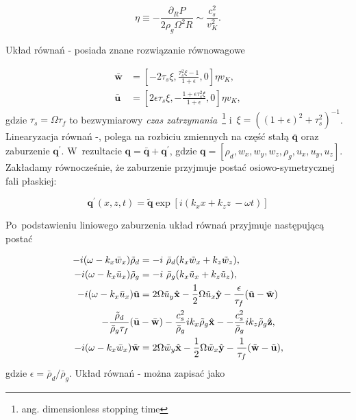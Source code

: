 \begin{equation}
\eta \equiv - \frac{\partial_R P}{2\rho_g\Omega^2 R} \sim \frac{c_s^2}{v_K^2}.
\end{equation}

Układ równań - posiada znane rozwiązanie równowagowe~\citep{N86}

\begin{align}
\bar{\mathbf{w}} &= \left[ 
 -2\tau_s\xi, \frac{\tau_s^2\xi - 1}{1+\epsilon},
 0
\right]\eta v_K, \label{eq:w0}\\
\bar{\mathbf{u}} &= \left[ 
 2\epsilon\tau_s\xi, -\frac{1 + \epsilon\tau_s^2\xi}{1+\epsilon},
 0
\right]\eta v_K, \label{eq:u0}
\end{align}
%
gdzie $\tau_s = \Omega \tau_f$ to bezwymiarowy \emph{czas
zatrzymania}~\footnote{ang. dimensionless stopping time} i~$\xi =
((1+\epsilon)^2 + \tau_s^2)^{-1}$.  Linearyzacja równań -,
polega na rozbiciu zmiennych na część stałą $\bar{\mathbf{q}}$ oraz zaburzenie
$\mathbf{q}^\prime$. W~rezultacie $\mathbf{q} =
\bar{\mathbf{q}} + \mathbf{q}^\prime$, gdzie $\mathbf{q}=[\rho_d, w_x, w_y, w_z,
\rho_g, u_x, u_y, u_z]$. Zakładamy równocześnie, że zaburzenie przyjmuje postać
osiowo-symetrycznej fali płaskiej:

\begin{equation}
   \label{eq:planar}
   \mathbf{q}^\prime(x,z,t) = \tilde{\mathbf{q}}
 \exp\left[i(k_x x + k_z z~-\omega t)\right]
\end{equation}

Po~podstawieniu liniowego zaburzenia układ równań przyjmuje następującą postać

\begin{align}
-i(\omega- k_x\bar{w}_x)\tilde{\rho}_d &= 
 - i~\bar{\rho}_d(k_x\tilde{w}_x + k_z\tilde{w}_z), \label{lin1}\\
-i(\omega- k_x\bar{u}_x)\tilde{\rho}_g &= 
 - i~\bar{\rho}_g(k_x\tilde{u}_x + k_z\tilde{u}_z), \label{lin2}\\
-i(\omega- k_x\bar{u}_x)\tilde{\mathbf{u}} &= 
 2\Omega \tilde{u}_y\hat{\mathbf{x}} - \frac{1}{2}\Omega \tilde{u}_x
 \hat{\mathbf{y}}
 -\frac{\epsilon}{\tau_f}(\tilde{\mathbf{u}} - \tilde{\mathbf{w}}) \notag\\
  -\frac{\tilde{\rho}_d}{\bar{\rho}_g\tau_f}
  (\bar{\mathbf{u}} &- \bar{\mathbf{w}})
  - \frac{c_s^2}{\bar{\rho}_g}ik_x\tilde{\rho}_g\hat{\mathbf{x}} -
  - \frac{c_s^2}{\bar{\rho}_g}ik_z\tilde{\rho}_g\hat{\mathbf{z}}, \label{lin3}\\
-i(\omega- k_x\bar{w}_x)\tilde{\mathbf{w}} &= 
 2\Omega \tilde{w}_y\hat{\mathbf{x}} - \frac{1}{2}\Omega \tilde{w}_x
 \hat{\mathbf{y}} 
 - \frac{1}{\tau_f} (\tilde{\mathbf{w}} - \tilde{\mathbf{u}}), \label{lin4}
\end{align}
%
gdzie $\epsilon = \bar{\rho}_d/\bar{\rho}_g$. Układ równań
- można zapisać jako

